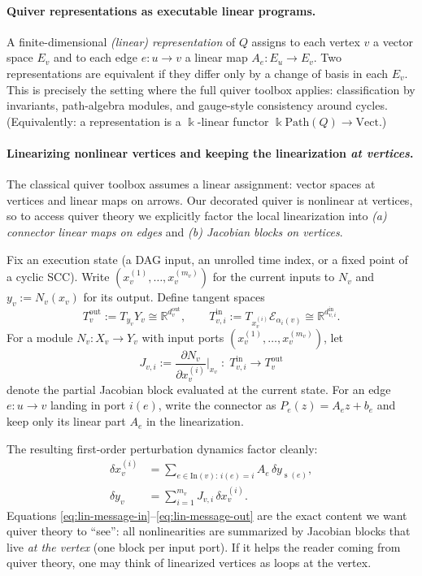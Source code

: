 \documentclass[11pt]{article}
\theoremstyle{definition}
\theoremstyle{plain}
\theoremstyle{remark}
\newcommand{\R}{\mathbb{R}}
\newcommand{\mc}[1]{\mathcal{#1}}
\newcommand{\Emb}{\mc{E}}
\newcommand{\src}{\operatorname{s}}
\begin{document}
\paragraph{Quiver representations as executable linear programs.}
A finite-dimensional \emph{(linear) representation} of $Q$ assigns to each vertex $v$ a vector space $E_v$ and to each edge $e:u\to v$ a linear map $A_e:E_u\to E_v$.
Two representations are equivalent if they differ only by a change of basis in each $E_v$.
This is precisely the setting where the full quiver toolbox applies: classification by invariants, path-algebra modules, and gauge-style consistency around cycles.
(Equivalently: a representation is a $\Bbbk$-linear functor $\Bbbk\mathrm{Path}(Q)\to\mathrm{Vect}$.)

\paragraph{Linearizing nonlinear vertices and keeping the linearization \emph{at vertices}.}
The classical quiver toolbox assumes a linear assignment: vector spaces at vertices and linear maps on arrows.
Our decorated quiver is nonlinear at vertices, so to access quiver theory we explicitly factor the local linearization into
\emph{(a) connector linear maps on edges} and \emph{(b) Jacobian blocks on vertices}.

Fix an execution state (a DAG input, an unrolled time index, or a fixed point of a cyclic SCC).
Write $(x_v^{(1)},\dots,x_v^{(m_v)})$ for the current inputs to $N_v$ and $y_v:=N_v(x_v)$ for its output.
Define tangent spaces
\[
T^{\text{out}}_v := T_{y_v}Y_v\cong \R^{d^{\text{out}}_v},
\qquad
T^{\text{in}}_{v,i} := T_{x_v^{(i)}}\Emb_{\alpha_i(v)}\cong \R^{d^{\text{in}}_{v,i}}.
\]
For a module $N_v:X_v\to Y_v$ with input ports $(x_v^{(1)},\dots,x_v^{(m_v)})$, let
\[
J_{v,i} := \frac{\partial N_v}{\partial x_v^{(i)}}\Big|_{x_v}
\;:\; T^{\text{in}}_{v,i}\to T^{\text{out}}_v
\]
denote the partial Jacobian block evaluated at the current state.
For an edge $e:u\to v$ landing in port $i(e)$, write the connector as $P_e(z)=A_e z+b_e$ and keep only its linear part $A_e$ in the linearization.

The resulting first-order perturbation dynamics factor cleanly:
\begin{align}
\delta x_v^{(i)} &= \sum_{e\in \mathrm{In}(v):\, i(e)=i} A_e\,\delta y_{\src(e)},
\label{eq:lin-message-in}
\\
\delta y_v &= \sum_{i=1}^{m_v} J_{v,i}\,\delta x_v^{(i)}.
\label{eq:lin-message-out}
\end{align}
Equations \eqref{eq:lin-message-in}--\eqref{eq:lin-message-out} are the exact content we want quiver theory to ``see'':
all nonlinearities are summarized by Jacobian blocks that live \emph{at the vertex} (one block per input port). If it helps the reader coming from quiver theory, one may think of linearized vertices as loops at the vertex. 
\end{document}
